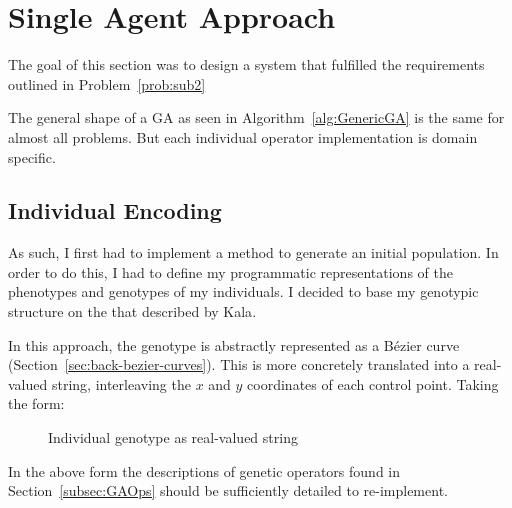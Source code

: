 
\section{Single Agent Approach}

The goal of this section was to design a system that fulfilled the requirements outlined in Problem~\ref{prob:sub2}

The general shape of a GA as seen in Algorithm~\ref{alg:GenericGA} is the same for almost all problems. But each individual operator implementation is domain specific.

\subsection{Individual Encoding}
As such, I first had to implement a method to generate an initial population. In order to do this, I had to define my programmatic representations of the phenotypes and genotypes of my individuals. I decided to base my genotypic structure on the that described by Kala\cite{kalaOnroadIntelligentVehicles2016}.

In this approach, the genotype is abstractly represented as a Bézier curve (Section~\ref{sec:back-bezier-curves}). This is more concretely translated into a real-valued string, interleaving the $x$ and $y$ coordinates of each control point. Taking the form:

\begin{figure}[ht]
	\centering
	\caption{\label{fig:GA_Genotype} Individual genotype as real-valued string }
\end{figure}

In the above form the descriptions of genetic operators found in Section~\ref{subsec:GAOps} should be sufficiently detailed to re-implement.

